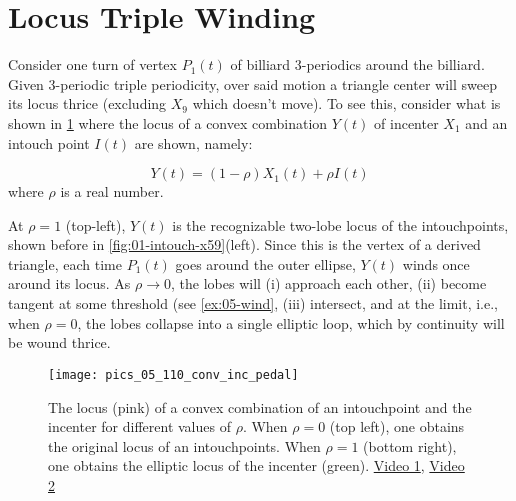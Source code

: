 \section{Locus Triple Winding}

Consider one turn of vertex $P_1(t)$ of billiard 3-periodics around the billiard. Given 3-periodic triple periodicity, over said motion a triangle center will sweep its locus thrice (excluding $X_9$ which doesn't move). To see this, consider what is shown in \cref{fig:05-inc-wind3} where the locus of a convex combination $Y(t)$ of incenter $X_1$ and an intouch point $I(t)$ are shown, namely:

\[ Y(t) = (1-\rho) X_1(t) +  \rho I(t)  \]
where $\rho$ is a real number.

At $\rho=1$ (top-left), $Y(t)$ is the recognizable two-lobe locus of the intouchpoints, shown before in \cref{fig:01-intouch-x59}(left). Since this is the vertex of a derived triangle, each time $P_1(t)$ goes around the outer ellipse, $Y(t)$ winds once around its locus. As  $\rho{\rightarrow}0$, the lobes will (i) approach each other, (ii) become tangent at some threshold (see \cref{ex:05-wind}, (iii) intersect, and at the limit, i.e., when $\rho=0$, the lobes collapse into a single elliptic loop, which by continuity will be wound thrice.

\begin{figure}
    \centering
    \texttt{[image: pics\_05\_110\_conv\_inc\_pedal]}
    \caption{The locus (pink) of a convex combination of an intouchpoint and the incenter for different values of $\rho$. When $\rho=0$ (top left), one obtains the original locus of an intouchpoints. When $\rho=1$ (bottom right), one obtains the elliptic locus of the incenter (green). \href{https://youtu.be/3Gr3Nh5-jHs}{Video 1}, \href{https://youtu.be/HZFjkWD_CnE}{Video 2}}
    \label{fig:05-inc-wind3}
\end{figure}
